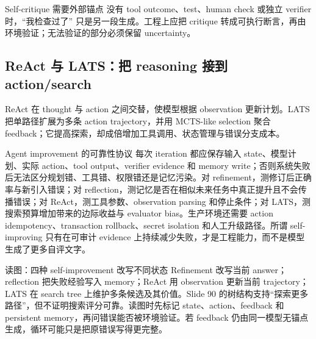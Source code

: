 
\begin{warningbox}{Self-critique 需要外部锚点}
没有 tool outcome、test、human check 或独立 verifier 时，``我检查过了'' 只是另一段生成。工程上应把 critique 转成可执行断言，再由环境验证；无法验证的部分必须保留 uncertainty。
\end{warningbox}

\subsection{ReAct 与 LATS：把 reasoning 接到 action/search}

ReAct 在 thought 与 action 之间交替，使模型根据 observation 更新计划。LATS 把单路径扩展为多条 action trajectory，并用 MCTS-like selection 聚合 feedback；它提高探索，却成倍增加工具调用、状态管理与错误分支成本。





\begin{warningbox}{Agent improvement 的可靠性协议}
每次 iteration 都应保存输入 state、模型计划、实际 action、tool output、verifier evidence 和 memory write；否则系统失败后无法区分规划错、工具错、权限错还是记忆污染。对 refinement，测修订后正确率与新引入错误；对 reflection，测记忆是否在相似未来任务中真正提升且不会传播错误；对 ReAct，测工具参数、observation parsing 和停止条件；对 LATS，测搜索预算增加带来的边际收益与 evaluator bias。生产环境还需要 action idempotency、transaction rollback、secret isolation 和人工升级路径。所谓 self-improving 只有在可审计 evidence 上持续减少失败，才是工程能力，而不是模型生成了更多自评文字。
\end{warningbox}

\begin{knowledgebox}{读图：四种 self-improvement 改写不同状态}
Refinement 改写当前 answer；reflection 把失败经验写入 memory；ReAct 用 observation 更新当前 trajectory；LATS 在 search tree 上维护多条候选及其价值。Slide 90 的树结构支持“探索更多路径”，但不证明搜索评分可靠。读图时先标记 state、action、feedback 和 persistent memory，再问错误能否被环境验证。若 feedback 仍由同一模型无锚点生成，循环可能只是把原错误写得更完整。
\end{knowledgebox}

